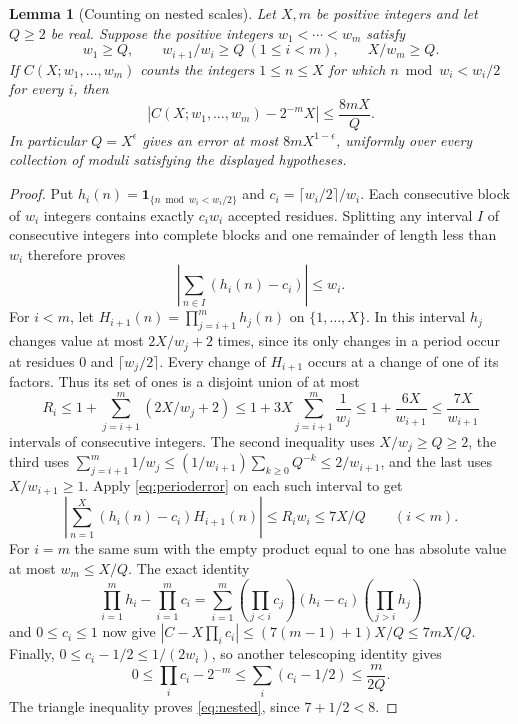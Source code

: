 \documentclass[10pt]{article}
\newtheorem{lemma}[theorem]{Lemma}
\theoremstyle{remark}
\newcommand{\ind}{\mathbf 1}
\begin{document}
\begin{lemma}[Counting on nested scales]\label{lem:nested}
Let $X,m$ be positive integers and let $Q\geq2$ be real. Suppose the
positive integers $w_1<\cdots<w_m$ satisfy
\[
 w_1\geq Q,\qquad w_{i+1}/w_i\geq Q\ (1\leq i<m),\qquad X/w_m\geq Q.
\]
If $C(X;w_1,\ldots,w_m)$ counts the integers $1\leq n\leq X$ for
which $n\bmod w_i<w_i/2$ for every $i$, then
\begin{equation}\label{eq:nested}
 \left|C(X;w_1,\ldots,w_m)-2^{-m}X\right|\leq\frac{8mX}{Q}.
\end{equation}
In particular $Q=X^\epsilon$ gives an error at most
$8mX^{1-\epsilon}$, uniformly over every collection of moduli satisfying
the displayed hypotheses.
\end{lemma}
\begin{proof}
Put $h_i(n)=\ind_{\{n\bmod w_i<w_i/2\}}$ and
$c_i=\lceil w_i/2\rceil/w_i$. Each consecutive block of $w_i$
integers contains exactly $c_iw_i$ accepted residues. Splitting any
interval $I$ of consecutive integers into complete blocks and one
remainder of length less than $w_i$ therefore proves
\begin{equation}\label{eq:perioderror}
 \left|\sum_{n\in I}(h_i(n)-c_i)\right|\leq w_i.
\end{equation}
For $i<m$, let $H_{i+1}(n)=\prod_{j=i+1}^m h_j(n)$ on
$\{1,\ldots,X\}$. In this interval $h_j$ changes value at most
$2X/w_j+2$ times, since its only changes in a period occur at residues
$0$ and $\lceil w_j/2\rceil$. Every change of $H_{i+1}$ occurs at
a change of one of its factors. Thus its set of ones is a disjoint
union of at most
\[
 R_i\leq1+\sum_{j=i+1}^m(2X/w_j+2)
 \leq1+3X\sum_{j=i+1}^m\frac1{w_j}
 \leq1+\frac{6X}{w_{i+1}}\leq\frac{7X}{w_{i+1}}
\]
intervals of consecutive integers. The second inequality uses
$X/w_j\geq Q\geq2$, the third uses
$\sum_{j=i+1}^m1/w_j\leq(1/w_{i+1})\sum_{k\geq0}Q^{-k}
\leq2/w_{i+1}$, and the last uses $X/w_{i+1}\geq1$.
Apply \eqref{eq:perioderror} on each such interval to get
\[
 \left|\sum_{n=1}^X(h_i(n)-c_i)H_{i+1}(n)\right|
 \leq R_iw_i\leq7X/Q\qquad(i<m).
\]
For $i=m$ the same sum with the empty product equal to one has
absolute value at most $w_m\leq X/Q$. The exact identity
\[
 \prod_{i=1}^m h_i-\prod_{i=1}^m c_i
 =\sum_{i=1}^m\left(\prod_{j<i}c_j\right)(h_i-c_i)
                         \left(\prod_{j>i}h_j\right)
\]
and $0\leq c_i\leq1$ now give
$|C-X\prod_i c_i|\leq(7(m-1)+1)X/Q\leq7mX/Q$.
Finally, $0\leq c_i-1/2\leq1/(2w_i)$, so another telescoping
identity gives
\[
 0\leq\prod_i c_i-2^{-m}\leq\sum_i(c_i-1/2)
 \leq\frac{m}{2Q}.
\]
The triangle inequality proves \eqref{eq:nested}, since $7+1/2<8$.
\end{proof}
\end{document}
